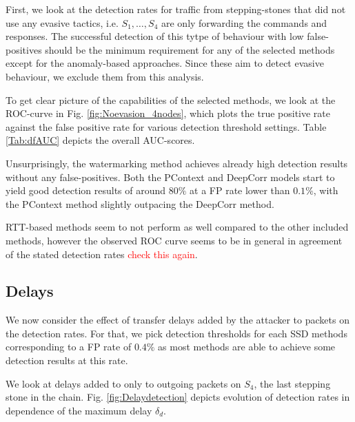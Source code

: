 \documentclass[runningheads]{llncs}\usepackage[]{graphicx}\usepackage[]{color}
\begin{document}
First, we look at the detection rates for traffic from stepping-stones that did not use any evasive tactics, i.e. $S_1,\dots,S_4$ are only forwarding the commands and responses. The successful detection of this tytpe of behaviour with low false-positives should be the minimum requirement for any of the selected methods except for the anomaly-based approaches. Since these aim to detect evasive behaviour, we exclude them from this analysis. 

To get clear picture of the capabilities of the selected methods, we look at the ROC-curve in Fig. \ref{fig:Noevasion_4nodes}, which plots the true positive rate against the false positive rate for various detection threshold settings. Table \ref{Tab:dfAUC} depicts the overall AUC-scores.



Unsurprisingly, the watermarking method achieves already high detection results without any false-positives. Both the PContext and DeepCorr models start to yield good detection results of around $80\%$ at a FP rate lower than $0.1\%$, with the PContext method slightly outpacing the DeepCorr method. 

RTT-based methods seem to not perform as well compared to the other included methods, however the observed ROC curve seems to be in general in agreement of the stated detection rates \textcolor{red}{check this again}.




\subsection{Delays}

We now consider the effect of transfer delays added by the attacker to packets on the detection rates. For that, we pick detection thresholds for each SSD methods corresponding to a FP rate of $0.4\%$ as most methods are able to achieve some detection results at this rate. 

We look at delays added to only to outgoing packets on $S_4$, the last stepping stone in the chain. Fig. \ref{fig:Delaydetection} depicts evolution of detection rates in dependence of the maximum delay $\delta_d$.


\end{document}
